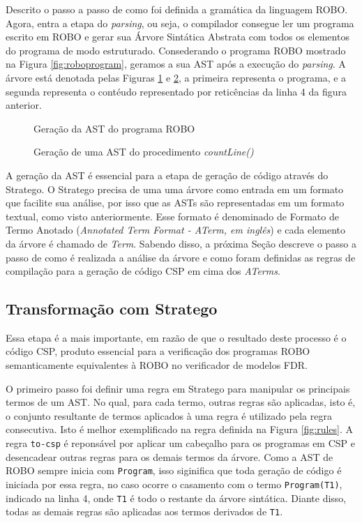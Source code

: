 Descrito o passo a passo de como foi definida a gramática da linguagem ROBO. Agora, entra a etapa do \textit{parsing}, ou seja, o compilador consegue ler um programa escrito em ROBO e gerar sua Árvore Sintática Abstrata com todos os elementos do programa de modo estruturado. Consederando o programa ROBO mostrado na Figura \ref{fig:roboprogram}, geramos a sua AST após a execução do \textit{parsing}. A árvore está denotada pelas Figuras \ref{fig:ast1} e \ref{fig:ast2}, a primeira representa o programa, e a segunda representa o contéudo representado por reticências da linha 4 da figura anterior.

\begin{figure}[h]
\centering
\caption{Geração da AST do programa ROBO}

\label{fig:ast1}
\end{figure}

\begin{figure}[h]
\centering
\caption{Geração de uma AST do procedimento \textit{countLine()}}

\label{fig:ast2}
\end{figure}

A geração da AST é essencial para a etapa de geração de código através do Stratego. O Stratego precisa de uma uma árvore como entrada em um formato que facilite sua análise, por isso que as ASTs são representadas em um formato textual, como visto anteriormente. Esse formato é denominado de Formato de Termo Anotado (\textit{Annotated Term Format - ATerm, em inglês}) e cada elemento da árvore é chamado de \textit{Term}. Sabendo disso, a próxima Seção descreve o passo a passo de como é realizada a análise da árvore e como foram definidas as regras de compilação para a geração de código CSP em cima dos \textit{ATerms}.

\subsection{Transformação com Stratego}

Essa etapa é a mais importante, em razão de que o resultado deste processo é o código CSP, produto essencial para a verificação dos programas ROBO semanticamente equivalentes à ROBO no verificador de modelos FDR.

O primeiro passo foi definir uma regra em Stratego para manipular os principais termos de um AST. No qual, para cada termo, outras regras são aplicadas, isto é, o conjunto resultante de termos aplicados à uma regra é utilizado pela regra consecutiva. Isto é melhor exemplificado na regra definida na Figura \ref{fig:rules}. A regra \texttt{to-csp} é reponsável por aplicar um cabeçalho para os programas em CSP e desencadear outras regras para os demais termos da árvore. Como a AST de ROBO sempre inicia com \texttt{Program}, isso siginifica que toda geração de código é iniciada por essa regra, no caso ocorre o casamento com o termo \texttt{Program(T1)}, indicado na linha 4, onde \texttt{T1} é todo o restante da árvore sintática. Diante disso, todas as demais regras são aplicadas aos termos derivados de \texttt{T1}.


